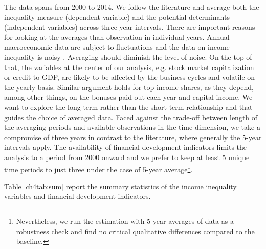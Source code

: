 \documentclass[preprint, nonatbib, 10pt]{elsarticle}
\begin{document}
The data spans from 2000 to 2014. We follow the literature \parencite{dabla2015causes,de2017finance} and average both the inequality measure (dependent variable) and the potential determinants (independent variables) across three year intervals. There are important reasons for looking at the averages than observation in individual years. Annual macroeconomic data are subject to fluctuations and the data on income inequality is noisy \textcite{delis2014}. Averaging should diminish the level of noise. On the top of that, the variables at the center of our analysis, e.g. stock market capitalization or credit to \ac{GDP}, are likely to be affected by the business cycles and volatile on the yearly basis. Similar argument holds for top income shares, as they depend, among other things, on the bonuses paid out each year and capital income. We want to explore the long-term rather than the short-term relationship and that guides the choice of averaged data. Faced against the trade-off between length of the averaging periods and available observations in the time dimension, we take a compromise of three years in contrast to the literature, where generally the 5-year intervals apply. The availability of financial development indicators limits the analysis to a period from 2000 onward and we prefer to keep at least 5 unique time periods to just three under the case of 5-year average\footnote{Nevertheless, we run the estimation with 5-year averages of data as a robustness check and find no critical qualitative differences compared to the baseline.}.

Table \ref{ch4tab:sum} report the summary statistics of the income inequality variables and financial development indicators.

\end{document}
